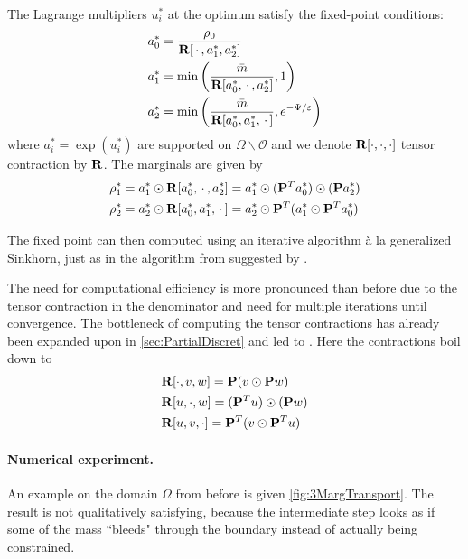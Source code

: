 \documentclass[../report.tex]{subfiles}
\begin{document}
\begin{prop}
The Lagrange multipliers $u_i^*$ at the optimum satisfy the fixed-point conditions:
\begin{align*}
	&a_0^* = \frac{\rho_0}{\mathbf{R}[\,\cdot\,, a_1^*, a_2^*]} \\
	&a_1^* = \min\left(
	\frac{\bar{m}}{\mathbf{R}[a_0^*, \,\cdot\,, a_2^*]}, 1\right) \\
	&a_2^* = \min\left(
	\frac{\bar{m}}{\mathbf{R}[a_0^*, a_1^*, \,\cdot\,]}, e^{-\Psi/\varepsilon}
	\right)
\end{align*}
where $a_i^* = \exp(u_i^*)$ are supported on $\Omega\backslash\mathscr{O}$ and we denote $\mathbf{R}[\cdot,\cdot,\cdot]$ tensor contraction by $\mathbf{R}$.
The marginals are given by
\[
\begin{aligned}
	\rho_1^* &=
	a_1^* \odot
	\mathbf{R}[a_0^*, \,\cdot\,, a_2^*] =
	a_1^* \odot
	(\mathbf{P}^Ta_0^*) \odot
	(\mathbf{P}a_2^*) \\
	\rho_2^* &= 
	a_2^* \odot \mathbf{R}[a_0^*, a_1^*, \,\cdot\,]
	= a_2^* \odot
	\mathbf{P}^T
	(a_1^* \odot \mathbf{P}^Ta_0^*)
\end{aligned}
\]
\end{prop}



The fixed point can then computed using an iterative algorithm à la generalized Sinkhorn, just as in the algorithm from  suggested by \cite{benamou2018entropy}.

The need for computational efficiency is more pronounced than before due to the tensor contraction in the denominator and need for multiple iterations until convergence. The bottleneck of computing the tensor contractions has already been expanded upon in \cref{sec:PartialDiscret} and led to . Here the contractions boil down to
\[
	\begin{aligned}
	&\mathbf{R}[\cdot,v,w] = 
	\mathbf{P} (v \odot \mathbf{P}w) \\
	&\mathbf{R}[u,\cdot,w]
	= (\mathbf{P}^Tu) \odot (\mathbf{P}w)  \\
	&\mathbf{R}[u, v, \cdot] = 
	\mathbf{P}^T (v \odot \mathbf{P}^T u)
	\end{aligned}
\]

\paragraph{Numerical experiment.} An example on the domain $\Omega$ from before is given \cref{fig:3MargTransport}. The result is not qualitatively satisfying, because the intermediate step looks as if some of the mass ``bleeds" through the boundary instead of actually being constrained.
\end{document}
